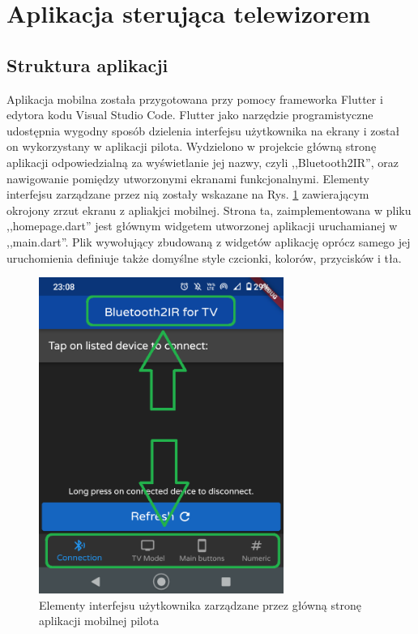 \documentclass[12pt,twoside]{article}
\begin{document}
\clearpage

\section{Aplikacja sterująca telewizorem}
\subsection{Struktura aplikacji}
Aplikacja mobilna została przygotowana przy pomocy frameworka Flutter i edytora kodu Visual Studio Code. Flutter jako narzędzie programistyczne udostępnia wygodny sposób dzielenia interfejsu użytkownika na ekrany i został on wykorzystany w aplikacji pilota. Wydzielono w projekcie główną stronę aplikacji odpowiedzialną za wyświetlanie jej nazwy, czyli ,,Bluetooth2IR'', oraz nawigowanie pomiędzy utworzonymi ekranami funkcjonalnymi. Elementy interfejsu zarządzane przez nią zostały wskazane na Rys. \ref*{Fig:mainPageElements} zawierającym okrojony zrzut ekranu z apliakjci mobilnej. Strona ta, zaimplementowana w pliku ,,homepage.dart'' jest głównym widgetem utworzonej aplikacji uruchamianej w ,,main.dart''. Plik wywołujący zbudowaną z widgetów aplikację oprócz samego jej uruchomienia definiuje także domyślne style czcionki, kolorów, przycisków i tła.
\begin{figure}[ht]
   \centering
   \includegraphics[width=8cm]{images/mainPageElements.png}
   \caption{Elementy interfejsu użytkownika zarządzane przez główną stronę aplikacji mobilnej pilota}
   \label{Fig:mainPageElements}
\end{figure}
\end{document}
